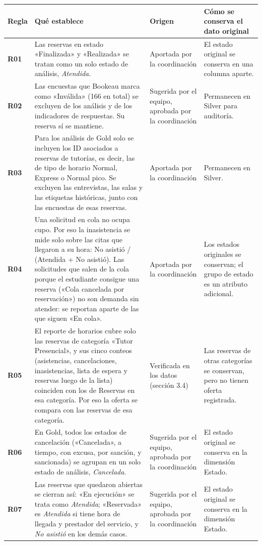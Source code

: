 \documentclass[11pt,letterpaper]{article}
\begin{document}
\begingroup\small\setlength{\tabcolsep}{4pt}\renewcommand{\arraystretch}{1.15}
\begin{longtable}{>{\raggedright\arraybackslash}p{}>{\raggedright\arraybackslash}p{}>{\raggedright\arraybackslash}p{}>{\raggedright\arraybackslash}p{}}
\toprule
\textbf{Regla} & \textbf{Qué establece} & \textbf{Origen} & \textbf{Cómo se conserva el dato original} \\
\midrule
\endhead
\textbf{R01} & Las reservas en estado «Finalizada» y «Realizada» se tratan como un solo estado de análisis, \emph{Atendida}. & Aportada por la coordinación & El estado original se conserva en una columna aparte. \\
\textbf{R02} & Las encuestas que Bookeau marca como «Inválida» (166 en total) se excluyen de los análisis y de los indicadores de respuestas. Su reserva sí se mantiene. & Sugerida por el equipo, aprobada por la coordinación & Permanecen en Silver para auditoría. \\
\textbf{R03} & Para los análisis de Gold solo se incluyen los ID asociados a reservas de tutorías, es decir, las de tipo de horario Normal, Express o Normal pico. Se excluyen las entrevistas, las salas y las etiquetas históricas, junto con las encuestas de esas reservas. & Aportada por la coordinación & Permanecen en Silver. \\
\textbf{R04} & Una solicitud en cola no ocupa cupo. Por eso la inasistencia se mide solo sobre las citas que llegaron a su hora: No asistió / (Atendida + No asistió). Las solicitudes que salen de la cola porque el estudiante consigue una reserva («Cola cancelada por reservación») no son demanda sin atender: se reportan aparte de las que siguen «En cola». & Aportada por la coordinación & Los estados originales se conservan; el grupo de estado es un atributo adicional. \\
\textbf{R05} & El reporte de horarios cubre solo las reservas de categoría «Tutor Presencial», y sus cinco conteos (asistencias, cancelaciones, inasistencias, lista de espera y reservas luego de la lista) coinciden con los de Reservas en esa categoría. Por eso la oferta se compara con las reservas de esa categoría. & Verificada en los datos (sección 3.4) & Las reservas de otras categorías se conservan, pero no tienen oferta registrada. \\
\textbf{R06} & En Gold, todos los estados de cancelación («Cancelada», a tiempo, con excusa, por sanción, y sancionada) se agrupan en un solo estado de análisis, \emph{Cancelada}. & Sugerida por el equipo, aprobada por la coordinación & El estado original se conserva en la dimensión Estado. \\
\textbf{R07} & Las reservas que quedaron abiertas se cierran así: «En ejecución» se trata como \emph{Atendida}; «Reservada» es \emph{Atendida} si tiene hora de llegada y prestador del servicio, y \emph{No asistió} en los demás casos. & Sugerida por el equipo, aprobada por la coordinación & El estado original se conserva en la dimensión Estado. \\
\bottomrule
\end{longtable}
\endgroup
\end{document}
